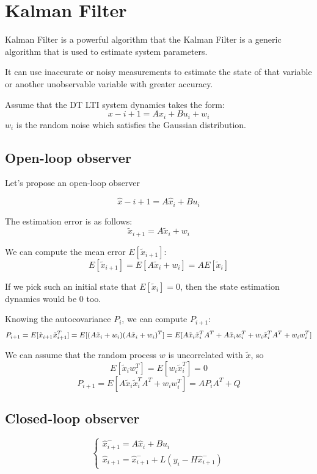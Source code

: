 
\section{Kalman Filter} 

Kalman Filter is a powerful algorithm that 
the Kalman Filter is a generic algorithm that is used to estimate system parameters. 


It can use inaccurate or noisy measurements to estimate the state of that variable 
or another unobservable variable with greater accuracy.



Assume that the DT LTI system dynamics takes the form: 
\[x-{i+1} = Ax_i + Bu_i + w_i\]
$w_i$ is the random noise which satisfies the Gaussian distribution. 

\subsection{Open-loop observer}
Let's propose an open-loop observer

\[\hat x-{i+1} = A \hat x_i + Bu_i\]

The estimation error is as follows:
\[\tilde{x}_{i+1} = A \tilde{x}_i + w_i\]

We can compute the mean error \(E[\tilde{x}_{i+1}]\):
\[E[\tilde{x}_{i+1}] = E[A \tilde{x}_i + w_i] = AE[\tilde{x}_i]\]

If we pick such an initial state that \(E[\tilde{x}_i] = 0\), then the state estimation dynamics would be 0 too.

Knowing the autocovariance \(P_i\), we can compute \(P_{i+1}\):
\[
P_{i+1} = E[\tilde{x}_{i+1} \tilde{x}_{i+1}^T] = E[(A \tilde{x}_i + w_i)(A \tilde{x}_i + w_i)^T] \\
= E[A \tilde{x}_i \tilde{x}_i^T A^T + A \tilde{x}_i w_i^T + w_i \tilde{x}_i^T A^T + w_i w_i^T]
\]

We can assume that the random process \(w\) is uncorrelated with \(\tilde{x}\), so 
\[ E[\tilde{x}_i w_i^T] = E[w_i \tilde{x}_i^T] = 0 \]
\[ P_{i+1} = E[A \tilde{x}_i \tilde{x}_i^T A^T + w_i w_i^T] = AP_iA^T + Q \]

\subsection{Closed-loop observer}
\[
\begin{cases}
    \hat{x}_{i+1}^- = A \hat{x}_i + Bu_i \\
    \hat{x}_{i+1} = \hat{x}_{i+1}^- + L(y_i - H \hat{x}_{i+1}^-)
\end{cases}
\] 

